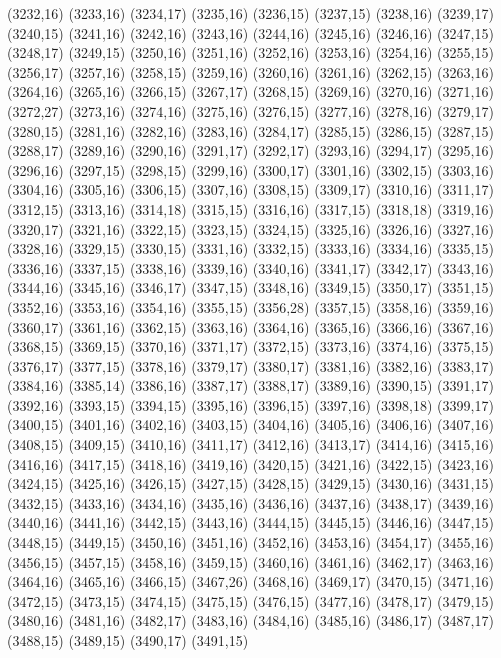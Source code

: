 (3232,16)
(3233,16)
(3234,17)
(3235,16)
(3236,15)
(3237,15)
(3238,16)
(3239,17)
(3240,15)
(3241,16)
(3242,16)
(3243,16)
(3244,16)
(3245,16)
(3246,16)
(3247,15)
(3248,17)
(3249,15)
(3250,16)
(3251,16)
(3252,16)
(3253,16)
(3254,16)
(3255,15)
(3256,17)
(3257,16)
(3258,15)
(3259,16)
(3260,16)
(3261,16)
(3262,15)
(3263,16)
(3264,16)
(3265,16)
(3266,15)
(3267,17)
(3268,15)
(3269,16)
(3270,16)
(3271,16)
(3272,27)
(3273,16)
(3274,16)
(3275,16)
(3276,15)
(3277,16)
(3278,16)
(3279,17)
(3280,15)
(3281,16)
(3282,16)
(3283,16)
(3284,17)
(3285,15)
(3286,15)
(3287,15)
(3288,17)
(3289,16)
(3290,16)
(3291,17)
(3292,17)
(3293,16)
(3294,17)
(3295,16)
(3296,16)
(3297,15)
(3298,15)
(3299,16)
(3300,17)
(3301,16)
(3302,15)
(3303,16)
(3304,16)
(3305,16)
(3306,15)
(3307,16)
(3308,15)
(3309,17)
(3310,16)
(3311,17)
(3312,15)
(3313,16)
(3314,18)
(3315,15)
(3316,16)
(3317,15)
(3318,18)
(3319,16)
(3320,17)
(3321,16)
(3322,15)
(3323,15)
(3324,15)
(3325,16)
(3326,16)
(3327,16)
(3328,16)
(3329,15)
(3330,15)
(3331,16)
(3332,15)
(3333,16)
(3334,16)
(3335,15)
(3336,16)
(3337,15)
(3338,16)
(3339,16)
(3340,16)
(3341,17)
(3342,17)
(3343,16)
(3344,16)
(3345,16)
(3346,17)
(3347,15)
(3348,16)
(3349,15)
(3350,17)
(3351,15)
(3352,16)
(3353,16)
(3354,16)
(3355,15)
(3356,28)
(3357,15)
(3358,16)
(3359,16)
(3360,17)
(3361,16)
(3362,15)
(3363,16)
(3364,16)
(3365,16)
(3366,16)
(3367,16)
(3368,15)
(3369,15)
(3370,16)
(3371,17)
(3372,15)
(3373,16)
(3374,16)
(3375,15)
(3376,17)
(3377,15)
(3378,16)
(3379,17)
(3380,17)
(3381,16)
(3382,16)
(3383,17)
(3384,16)
(3385,14)
(3386,16)
(3387,17)
(3388,17)
(3389,16)
(3390,15)
(3391,17)
(3392,16)
(3393,15)
(3394,15)
(3395,16)
(3396,15)
(3397,16)
(3398,18)
(3399,17)
(3400,15)
(3401,16)
(3402,16)
(3403,15)
(3404,16)
(3405,16)
(3406,16)
(3407,16)
(3408,15)
(3409,15)
(3410,16)
(3411,17)
(3412,16)
(3413,17)
(3414,16)
(3415,16)
(3416,16)
(3417,15)
(3418,16)
(3419,16)
(3420,15)
(3421,16)
(3422,15)
(3423,16)
(3424,15)
(3425,16)
(3426,15)
(3427,15)
(3428,15)
(3429,15)
(3430,16)
(3431,15)
(3432,15)
(3433,16)
(3434,16)
(3435,16)
(3436,16)
(3437,16)
(3438,17)
(3439,16)
(3440,16)
(3441,16)
(3442,15)
(3443,16)
(3444,15)
(3445,15)
(3446,16)
(3447,15)
(3448,15)
(3449,15)
(3450,16)
(3451,16)
(3452,16)
(3453,16)
(3454,17)
(3455,16)
(3456,15)
(3457,15)
(3458,16)
(3459,15)
(3460,16)
(3461,16)
(3462,17)
(3463,16)
(3464,16)
(3465,16)
(3466,15)
(3467,26)
(3468,16)
(3469,17)
(3470,15)
(3471,16)
(3472,15)
(3473,15)
(3474,15)
(3475,15)
(3476,15)
(3477,16)
(3478,17)
(3479,15)
(3480,16)
(3481,16)
(3482,17)
(3483,16)
(3484,16)
(3485,16)
(3486,17)
(3487,17)
(3488,15)
(3489,15)
(3490,17)
(3491,15)
